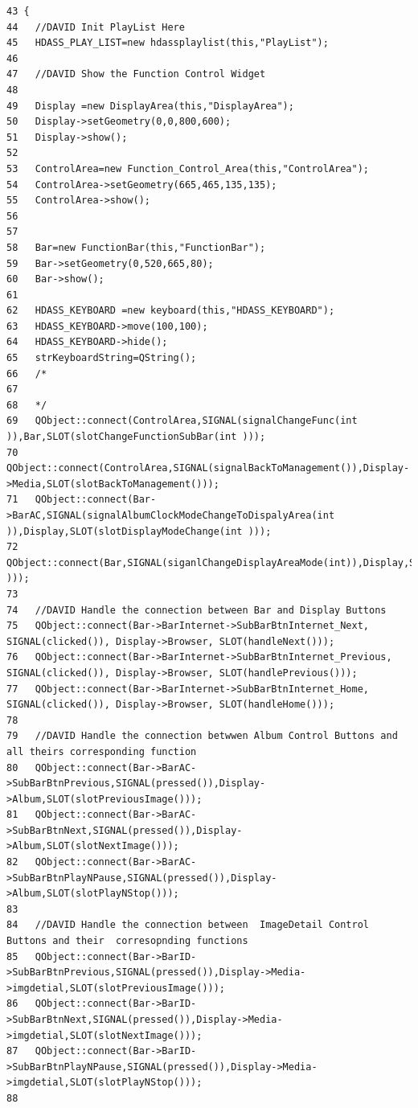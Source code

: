 \footnotesize\begin{verbatim}43 {
44   //DAVID Init PlayList Here
45   HDASS_PLAY_LIST=new hdassplaylist(this,"PlayList");
46   
47   //DAVID Show the Function Control Widget 
48   
49   Display =new DisplayArea(this,"DisplayArea");
50   Display->setGeometry(0,0,800,600);
51   Display->show();
52   
53   ControlArea=new Function_Control_Area(this,"ControlArea");
54   ControlArea->setGeometry(665,465,135,135);
55   ControlArea->show();
56   
57   
58   Bar=new FunctionBar(this,"FunctionBar");
59   Bar->setGeometry(0,520,665,80);
60   Bar->show();
61   
62   HDASS_KEYBOARD =new keyboard(this,"HDASS_KEYBOARD");
63   HDASS_KEYBOARD->move(100,100);
64   HDASS_KEYBOARD->hide();
65   strKeyboardString=QString();
66   /*
67 
68   */
69   QObject::connect(ControlArea,SIGNAL(signalChangeFunc(int )),Bar,SLOT(slotChangeFunctionSubBar(int )));
70   QObject::connect(ControlArea,SIGNAL(signalBackToManagement()),Display->Media,SLOT(slotBackToManagement()));
71   QObject::connect(Bar->BarAC,SIGNAL(signalAlbumClockModeChangeToDispalyArea(int )),Display,SLOT(slotDisplayModeChange(int )));
72   QObject::connect(Bar,SIGNAL(siganlChangeDisplayAreaMode(int)),Display,SLOT(slotDisplayModeChange(int )));
73   
74   //DAVID Handle the connection between Bar and Display Buttons
75   QObject::connect(Bar->BarInternet->SubBarBtnInternet_Next, SIGNAL(clicked()), Display->Browser, SLOT(handleNext()));
76   QObject::connect(Bar->BarInternet->SubBarBtnInternet_Previous, SIGNAL(clicked()), Display->Browser, SLOT(handlePrevious()));
77   QObject::connect(Bar->BarInternet->SubBarBtnInternet_Home, SIGNAL(clicked()), Display->Browser, SLOT(handleHome()));
78   
79   //DAVID Handle the connection betwwen Album Control Buttons and all theirs corresponding function
80   QObject::connect(Bar->BarAC->SubBarBtnPrevious,SIGNAL(pressed()),Display->Album,SLOT(slotPreviousImage()));
81   QObject::connect(Bar->BarAC->SubBarBtnNext,SIGNAL(pressed()),Display->Album,SLOT(slotNextImage()));
82   QObject::connect(Bar->BarAC->SubBarBtnPlayNPause,SIGNAL(pressed()),Display->Album,SLOT(slotPlayNStop()));
83   
84   //DAVID Handle the connection between  ImageDetail Control Buttons and their  corresopnding functions 
85   QObject::connect(Bar->BarID->SubBarBtnPrevious,SIGNAL(pressed()),Display->Media->imgdetial,SLOT(slotPreviousImage()));
86   QObject::connect(Bar->BarID->SubBarBtnNext,SIGNAL(pressed()),Display->Media->imgdetial,SLOT(slotNextImage()));
87   QObject::connect(Bar->BarID->SubBarBtnPlayNPause,SIGNAL(pressed()),Display->Media->imgdetial,SLOT(slotPlayNStop()));
88   

\end{verbatim}
